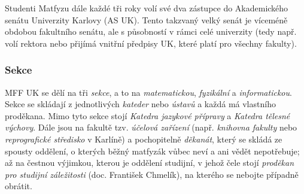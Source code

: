 Studenti Matfyzu dále každé tři roky volí své dva zástupce do
Akademického senátu Univerzity Karlovy (AS UK).
Tento takzvaný velký senát je víceméně obdobou fakultního senátu,
ale s působností v rámci celé univerzity (tedy např. volí rektora
nebo přijímá vnitřní předpisy UK, které platí pro všechny fakulty).


\subsubsection{Sekce}
MFF UK se dělí na tři \textit{sekce}, a to na \textit{matematickou}, \textit{fyzikální} a \textit{informatickou}.
Sekce se skládají z jednotlivých \textit{kateder} nebo \textit{ústavů} a každá má vlastního proděkana.
Mimo tyto sekce stojí \textit{Katedra jazykové přípravy} a \textit{Katedra tělesné výchovy}.
Dále jsou na fakultě tzv. \textit{účelová zařízení}
(např. \textit{knihovna fakulty} nebo \textit{reprografické středisko} v Karlíně)
a pochopitelně \textit{děkanát}, který se skládá ze spousty oddělení, o kterých běžný
matfyzák vůbec neví a ani vědět nepotřebuje; až na čestnou výjimkou,
kterou je oddělení studijní, v jehož čele stojí \textit{proděkan pro studijní záležitosti}
(doc. František Chmelík), na kterého se nebojte případně obrátit.